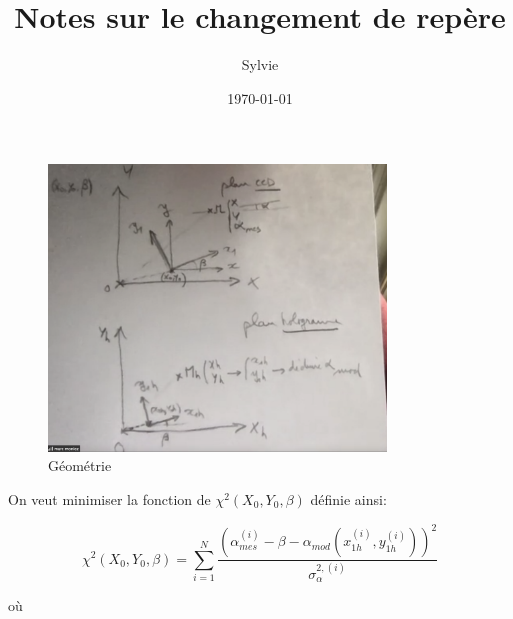 \documentclass[12pt,twoside]{article}
\begin{document}
%


\title{Notes sur le changement de repère}


\author{Sylvie}
\date{\today}
\maketitle



\begin{figure}
\centering
\includegraphics[width=0.8\textwidth]{Fig1.png}
\caption{Géométrie}
\end{figure}

On veut minimiser la fonction de $\chi^2(X_0,Y_0,\beta)$ définie ainsi:

\begin{equation}
 \chi^2(X_0,Y_0,\beta) = \sum_{i=1}^N \frac{\left( \alpha_{mes}^{(i)} - \beta - \alpha_{mod}(
 x^{(i)}_{1h},y^{(i)}_{1h})\right)^2}{\sigma_{\alpha}^{2, (i)}}
\end{equation}


où
\end{document}
